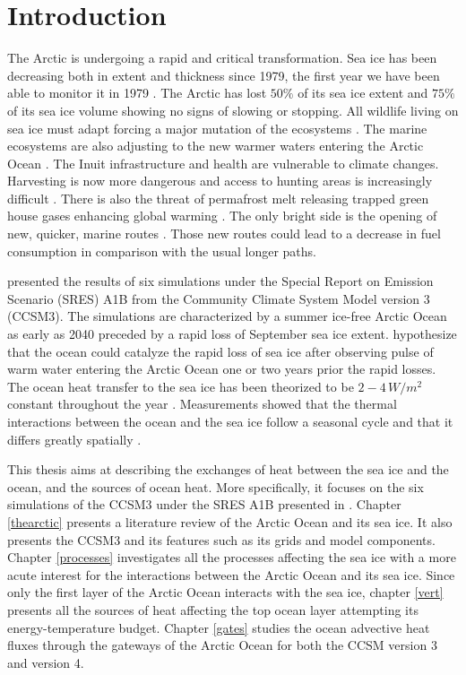 \section{Introduction}

The Arctic is undergoing a rapid and critical transformation. Sea ice has been decreasing both in extent and thickness since 1979, the first year we have been able to monitor it in 1979 \citep{overland2013}. The Arctic has lost $50\%$ of its sea ice extent and $75\%$ of its sea ice volume showing no signs of slowing or stopping. All wildlife living on sea ice must adapt forcing a major mutation of the ecosystems \citep{Pfirman2009pb,Laidre07122008}. The marine ecosystems are also adjusting to the new warmer waters entering the Arctic Ocean \citep{Beszc2011,wassmann2011}.  The Inuit infrastructure and health are vulnerable to climate changes. Harvesting is now more dangerous and access to hunting areas is increasingly difficult \citep{ford2006,ford2009}. There is also the threat of permafrost melt releasing trapped green house gases enhancing global warming \citep{permafrost}. The only bright side is the opening of new, quicker, marine routes \citep{Johannessen:2000uq}. Those new routes could lead to a decrease in fuel consumption in comparison with the usual longer paths.  

\cite{ISI:000242942100008} presented the results of six simulations under the Special Report on Emission Scenario (SRES) A1B from the Community Climate System Model version 3 (CCSM3). The simulations are characterized by a summer ice-free Arctic Ocean as early as 2040 preceded by a rapid loss of September sea ice extent. \cite{ISI:000242942100008} hypothesize that the ocean could catalyze the rapid loss of sea ice after observing pulse of warm water entering the Arctic Ocean one or two years prior the rapid losses. The ocean heat transfer to the sea ice has been theorized to be $2-4\,W/m^2$ constant throughout the year \citep{ISI:A1971I688400007}. Measurements showed that the thermal interactions between the ocean and the sea ice follow a seasonal cycle and that it differs greatly spatially \citep{ISI:A1982NF38100017,GRL:GRL17601,ISI:A1989AP36800003,GRL:GRL15407}. 

This thesis aims at describing the exchanges of heat between the sea ice and the ocean, and the sources of ocean heat. More specifically, it focuses on the six simulations of the CCSM3 under the SRES A1B presented in \cite{ISI:000242942100008}. Chapter \ref{thearctic} presents a literature review of the Arctic Ocean and its sea ice. It also presents the CCSM3 and its features such as its grids and model components. Chapter \ref{processes} investigates all the processes affecting the sea ice with a more acute interest for the interactions between the Arctic Ocean and its sea ice. Since only the first layer of the Arctic Ocean interacts with the sea ice, chapter \ref{vert} presents all the sources of heat affecting the top ocean layer attempting its energy-temperature budget. Chapter \ref{gates} studies the ocean advective heat fluxes through the gateways of the Arctic Ocean for both the CCSM version 3 and version 4. 





